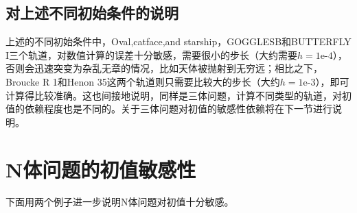 \documentclass{article}
\begin{document}
\subsection{对上述不同初始条件的说明}
\par 上述的不同初始条件中，Oval,catface,and starship，GOGGLESB和BUTTERFLY I三个轨道，对数值计算的误差十分敏感，需要很小的步长（大约需要$h=\text{1e-4}$），否则会迅速突变为杂乱无章的情况，比如天体被抛射到无穷远；相比之下，Broucke R 1和Henon 35这两个轨道则只需要比较大的步长（大约$h=\text{1e-3}$），即可计算得比较准确。这也间接地说明，同样是三体问题，计算不同类型的轨道，对初值的依赖程度也是不同的。关于三体问题对初值的敏感性依赖将在下一节进行说明。
\section{N体问题的初值敏感性}
\par 下面用两个例子进一步说明N体问题对初值十分敏感。
\end{document}
